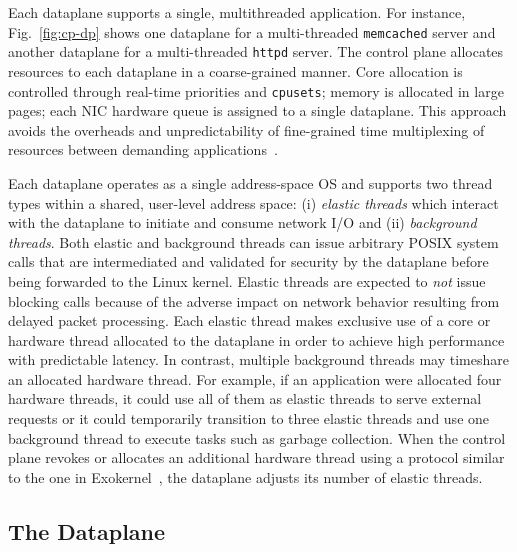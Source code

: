 Each \ix dataplane supports a single, multithreaded application. For
instance, Fig.~\ref{fig:cp-dp} shows one dataplane for a
multi-threaded \texttt{memcached} server and another dataplane for a
multi-threaded \texttt{httpd} server. The control plane allocates
resources to each dataplane in a coarse-grained manner. Core
allocation is controlled through real-time priorities and
\texttt{cpusets}; memory is allocated in large pages; each NIC
hardware queue is assigned to a single dataplane. This approach avoids
the overheads and unpredictability of fine-grained time multiplexing
of resources between demanding
applications~\cite{DBLP:conf/eurosys/LeverichK14}.

Each \ix dataplane operates as a single address-space OS and supports
two thread types within a shared, user-level address space: (i)
\emph{elastic threads} which interact with the \ix dataplane to
initiate and consume network I/O and (ii) \emph{background threads}.
Both elastic and background threads can issue arbitrary POSIX system
calls that are intermediated and validated for security by the
dataplane before being forwarded to the Linux kernel. Elastic threads
are expected to \emph{not} issue blocking calls because of the adverse
impact on network behavior resulting from delayed packet processing.
Each elastic
thread makes exclusive use of a core or hardware thread allocated to
the dataplane in order to achieve high performance with predictable
latency. In contrast, multiple background threads may timeshare an
allocated hardware thread. For example, if an application were
allocated four hardware threads, it could use all of them as elastic
threads to serve external requests or it could temporarily transition
to three elastic threads and use one background thread to execute
tasks such as garbage collection. When the control plane revokes or
allocates an additional hardware thread using a protocol similar to
the one in Exokernel~\cite{DBLP:conf/sosp/EnglerKO95}, the dataplane
adjusts its number of elastic threads.



\subsection{The \ix Dataplane}
\label{sec:impl:dpkernel}

